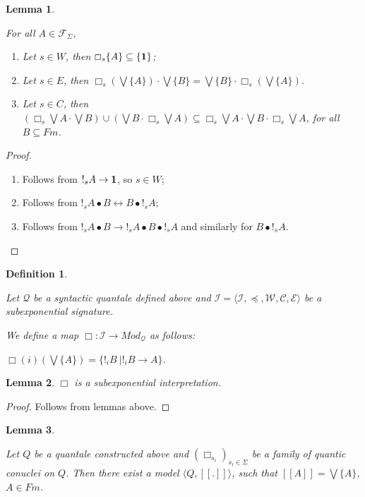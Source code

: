 \documentclass[a4paper]{article}
\theoremstyle{defin}
\newtheorem{defin}{Definition}
\theoremstyle{theorem}
\theoremstyle{prop}
\theoremstyle{lemma}
\newtheorem{lemma}{Lemma}
\theoremstyle{ex}
\theoremstyle{col}
\begin{document}
\begin{lemma}
$ $

For all $A \in \mathcal{F}_{\Sigma}$,
  \begin{enumerate}
    \item Let $s \in W$, then $\Box_s \{ A \} \subseteq \{ {\bf 1} \}$;
    \item Let $s \in E$, then $\Box_s (\bigvee \{ A \}) \cdot \bigvee \{ B \} = \bigvee \{ B\} \cdot \Box_s (\bigvee \{ A \})$.
    \item Let $s \in C$, then $(\Box_s \bigvee A \cdot \bigvee B) \cup (\bigvee B \cdot \Box_s \bigvee A) \subseteq \Box_s \bigvee A \cdot \bigvee B \cdot \Box_s \bigvee A$, for all $B \subseteq Fm$.
  \end{enumerate}
\end{lemma}

\begin{proof}
$ $

\begin{enumerate}
  \item Follows from $!_s A \rightarrow {\bf 1}$, so $s \in W$;
  \item Follows from $!_s A \bullet B \leftrightarrow B \bullet !_s A$;
  \item Follows from $!_s A \bullet B \rightarrow !_s A \bullet B \bullet !_s A$ and similarly for $B \bullet !_s A$.
\end{enumerate}
\end{proof}

\begin{defin}
$ $

Let $\mathcal{Q}$ be a syntactic quantale defined above and $\mathcal{I} = \langle \mathcal{I}, \preceq,
\mathcal{W}, \mathcal{C}, \mathcal{E} \rangle$ be a subexponential signature.

We define a map $\Box : \mathcal{I} \to Mod_{\mathcal{Q}}$ as follows:

$\Box(i)(\bigvee \{ A \} ) = \{ !_i B \: | !_i B \rightarrow A \}$.
\end{defin}

\begin{lemma} $\Box$ is a subexponential interpretation.
\end{lemma}

\begin{proof}
  Follows from lemmas above.
\end{proof}

\begin{lemma}
$ $

  Let $Q$ be a quantale constructed above and $(\Box_{s_i})_{s_i \in \Sigma}$ be a family of quantic conuclei on $Q$.
  Then there exist a model $\langle Q, [\![.]\!]\rangle$, such that $[\![A]\!] = \bigvee \{ A \}$, $A \in Fm$.
\end{lemma}
\end{document}
